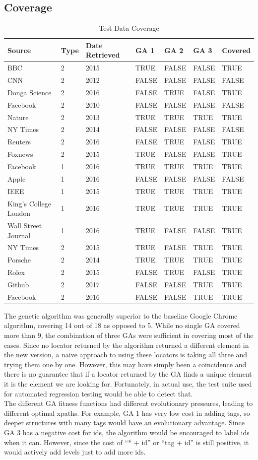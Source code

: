 \documentclass[format=acmlarge, nonacm=true]{acmart}
\begin{document}
\subsection{Coverage}
\begin{table}
	\label{tab:cover}
	\caption{Test Data Coverage}
	\begin{tabular}{lll|lll|l}
		\toprule
		Source&	Type&	Date Retrieved&	GA 1&	GA 2&	GA 3&	Covered\\
		\midrule
		BBC&2&2015&TRUE&FALSE&FALSE&TRUE\\
		CNN&2&2012&FALSE&FALSE&FALSE&FALSE\\
		Donga Science&2&2016&FALSE&TRUE&FALSE&TRUE\\
		Facebook&2&2010&FALSE&FALSE&FALSE&FALSE\\
		Nature&2&2013&TRUE&TRUE&TRUE&TRUE\\
		NY Times&2&2014&FALSE&FALSE&FALSE&FALSE\\
		Reuters&2&2016&FALSE&TRUE&FALSE&TRUE\\
		Foxnews&2&2015&TRUE&FALSE&FALSE&TRUE\\
		Facebook&1&2016&TRUE&TRUE&TRUE&TRUE\\
		Apple&1&2016&FALSE&FALSE&FALSE&FALSE\\
		IEEE&1&2015&TRUE&TRUE&TRUE&TRUE\\
		King's College London&1&2016&TRUE&TRUE&TRUE&TRUE\\
		Wall Street Journal&1&2016&TRUE&FALSE&FALSE&TRUE\\
		NY Times&2&2015&TRUE&FALSE&TRUE&TRUE\\
		Porsche&2&2014&TRUE&TRUE&TRUE&TRUE\\
		Rolex&2&2015&FALSE&TRUE&FALSE&TRUE\\
		Github&2&2017&FALSE&FALSE&TRUE&TRUE\\
		Facebook&2&2016&FALSE&FALSE&TRUE&TRUE\\
		\bottomrule
	\end{tabular}
\end{table}

The genetic algorithm was generally superior to the baseline Google Chrome algorithm, covering 14 out of 18 as opposed to 5. While no single GA covered more than 9, the combination of three GAs were sufficient in covering most of the cases. Since no locator returned by the algorithm returned a different element in the new version, a naive approach to using these locators is taking all three and trying them one by one. However, this may have simply been a coincidence and there is no guarantee that if a locator returned by the GA finds a unique element it is the element we are looking for. Fortunately, in actual use, the test suite used for automated regression testing would be able to detect that.\\
The different GA fitness functions had different evolutionary pressures, leading to different optimal xpaths. For example, GA 1 has very low cost in adding tags, so deeper structures with many tags would have an evolutionary advantage. Since GA 3 has a negative cost for ids, the algorithm would be encouraged to label ids when it can. However, since the cost of ``*  + id'' or ``tag + id'' is still positive, it would actively add levels just to add more ids. 
\end{document}
